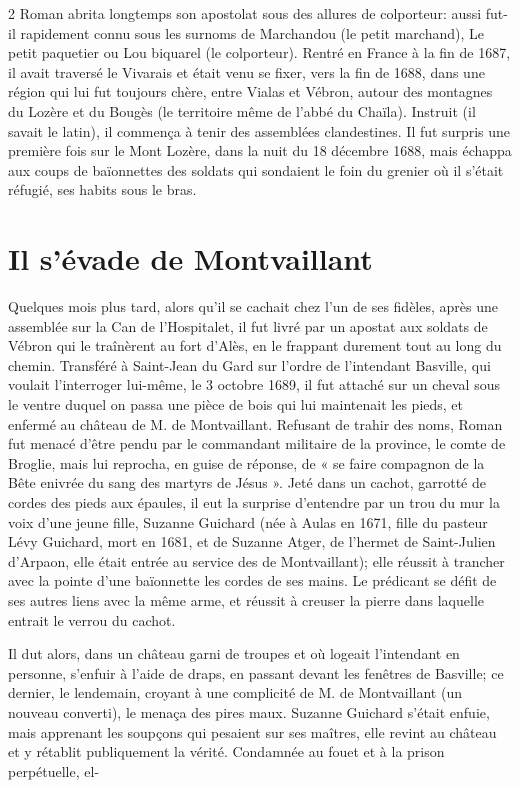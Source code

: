 {\begin{multicols}{2}
Roman abrita longtemps son apostolat sous des allures de colporteur: aussi fut-il rapidement connu sous les surnoms de Marchandou (le petit marchand), Le petit paquetier ou Lou biquarel (le colporteur). Rentré en France à la fin de 1687, il avait traversé le Vivarais et était venu se fixer, vers la fin de 1688, dans une région qui lui fut toujours chère, entre Vialas et Vébron, autour des montagnes du Lozère et du Bougès (le territoire même de l’abbé du Chaïla). Instruit (il savait le latin), il commença à tenir des assemblées clandestines. Il fut surpris une première fois sur le Mont Lozère, dans la nuit du 18 décembre 1688, mais échappa aux coups de baïonnettes des soldats qui sondaient le foin du grenier où il s’était réfugié, ses habits sous le bras.

\section*{Il s’évade de Montvaillant}

Quelques mois plus tard, alors qu’il se cachait chez l’un de ses fidèles, après une assemblée sur la Can de l’Hospitalet, il fut livré par un apostat aux soldats de Vébron qui le traînèrent au fort d’Alès, en le frappant durement tout au long du chemin. Transféré à Saint-Jean du Gard sur l’ordre de l’intendant Basville, qui voulait l’interroger lui-même, le 3 octobre 1689, il fut attaché sur un cheval sous le ventre duquel on passa une pièce de bois qui lui maintenait les pieds, et enfermé au château de M. de Montvaillant. Refusant de trahir des noms, Roman fut menacé d’être pendu par le commandant militaire de la province, le comte de Broglie, mais lui reprocha, en guise de réponse, de « se faire compagnon de la Bête enivrée du sang des martyrs de Jésus ». Jeté dans un cachot, garrotté de cordes des pieds aux épaules, il eut la surprise d’entendre par un trou du mur la voix d’une jeune fille, Suzanne Guichard (née à Aulas en 1671, fille du pasteur Lévy Guichard, mort en 1681, et de Suzanne Atger, de l’hermet de Saint-Julien d’Arpaon, elle était entrée au service des de Montvaillant); elle réussit à trancher avec la pointe d’une baïonnette les cordes de ses mains. Le prédicant se défit de ses autres liens avec la même arme, et réussit à creuser la pierre dans laquelle entrait le verrou du cachot.

Il dut alors, dans un château garni de troupes et où logeait l’intendant en personne, s’enfuir à l’aide de draps, en passant devant les fenêtres de Basville; ce dernier, le lendemain, croyant à une complicité de M. de Montvaillant (un nouveau converti), le menaça des pires maux. Suzanne Guichard s’était enfuie, mais apprenant les soupçons qui pesaient sur ses maîtres, elle revint au château et y rétablit publiquement la vérité. Condamnée au fouet et à la prison perpétuelle, el-

\end{multicols}
}

